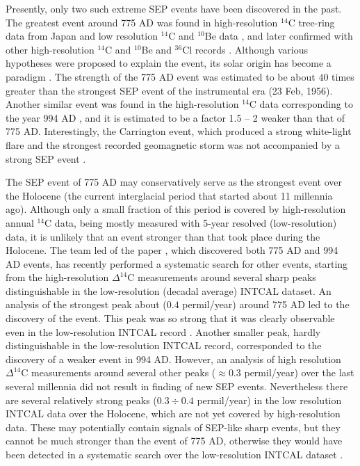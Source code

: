 \documentclass[fleqn,12pt]{SelfArx} %
\begin{document}
	
Presently, only two such extreme SEP events have been discovered in the past.
The greatest event around 775 AD was found in high-resolution $^{14}$C tree-ring data from Japan \cite{18} and low
resolution $^{14}$C and $^{10}$Be data \cite{19}, and later confirmed with other high-resolution $^{14}$C \cite{7,20,21}
and $^{10}$Be and $^{36}$Cl records \cite{22}.
Although various hypotheses were proposed to explain the event, its solar origin has become a paradigm \cite{7,8}.
The strength of the 775 AD event was estimated to be  about $ 40$ times greater than the strongest SEP event of 
the instrumental era (23 Feb, 1956).
Another similar event was found in the high-resolution $^{14}$C data corresponding to the year 994 AD
\cite{23}, and it is estimated to be a factor 1.5 -- 2 weaker than that of 775 AD.
Interestingly, the Carrington event, which produced a strong white-light flare and the strongest
recorded geomagnetic storm \cite{24}  was not accompanied by a strong SEP event \cite{17,19}.

The SEP event of 775 AD may conservatively serve as the strongest event over the Holocene
 (the current interglacial period that started about 11 millennia ago).
Although only a small fraction of this period is covered by high-resolution annual $^{14}$C data, being mostly
 measured with 5-year resolved
 (low-resolution) data, it is unlikely that an event stronger than that took place during the Holocene.
The team led of the paper \cite{25}, which discovered both 775 AD and 994 AD events, has recently performed a 
systematic search for other events,
 starting from the high-resolution $\Delta ^{14}$C measurements around several sharp peaks distinguishable in the 
 low-resolution
 (decadal average) INTCAL dataset.
An analysis of the strongest peak about ($0.4$ {permil/year}) around 775 AD led to the discovery of the event.
This peak was so strong that it was clearly observable even in the low-resolution INTCAL record \cite{19}.
Another smaller peak, hardly distinguishable in the low-resolution INTCAL record, corresponded to the discovery 
of a weaker event in 994 AD.
However, an analysis of high resolution $\Delta ^{14}$C measurements around several other peaks ($\approx 0.3$ 
{permil/year})
 over the last several millennia did not result in finding of new SEP events.
Nevertheless there are several relatively strong peaks ($0.3 \div 0.4$ {permil/year}) in the
low resolution INTCAL data over the Holocene, which are not yet covered by high-resolution data.
These may potentially contain signals of SEP-like sharp events, but they cannot be much stronger than the event 
of 775 AD, otherwise
they would have been detected in a systematic search over the low-resolution INTCAL dataset \cite{26}.
\end{document}
